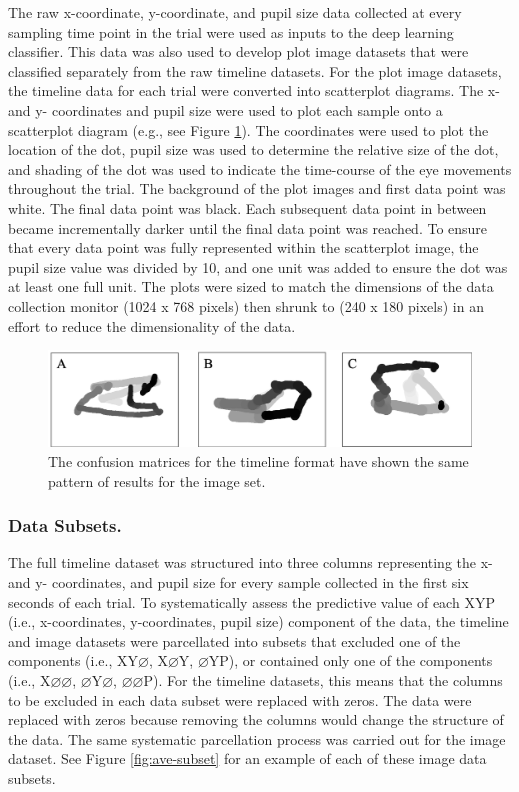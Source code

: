 \documentclass[
  english,
  man,floatsintext]{apa6}
\begin{document}
The raw x-coordinate, y-coordinate, and pupil size data collected at every sampling time point in the trial were used as inputs to the deep learning classifier. This data was also used to develop plot image datasets that were classified separately from the raw timeline datasets. For the plot image datasets, the timeline data for each trial were converted into scatterplot diagrams. The x- and y- coordinates and pupil size were used to plot each sample onto a scatterplot diagram (e.g., see Figure \ref{fig:ave-condition}). The coordinates were used to plot the location of the dot, pupil size was used to determine the relative size of the dot, and shading of the dot was used to indicate the time-course of the eye movements throughout the trial. The background of the plot images and first data point was white. The final data point was black. Each subsequent data point in between became incrementally darker until the final data point was reached. To ensure that every data point was fully represented within the scatterplot image, the pupil size value was divided by 10, and one unit was added to ensure the dot was at least one full unit. The plots were sized to match the dimensions of the data collection monitor (1024 x 768 pixels) then shrunk to (240 x 180 pixels) in an effort to reduce the dimensionality of the data.

\begin{figure}
\centering
\includegraphics{images/cond_imgs.png}
\caption{\label{fig:ave-condition}The confusion matrices for the timeline format have shown the same pattern of results for the image set.}
\end{figure}

\subsubsection{Data Subsets.}

The full timeline dataset was structured into three columns representing the x- and y- coordinates, and pupil size for every sample collected in the first six seconds of each trial. To systematically assess the predictive value of each XYP (i.e., x-coordinates, y-coordinates, pupil size) component of the data, the timeline and image datasets were parcellated into subsets that excluded one of the components (i.e., XY\(\varnothing\), X\(\varnothing\)Y, \(\varnothing\)YP), or contained only one of the components (i.e., X\(\varnothing\varnothing\), \(\varnothing\)Y\(\varnothing\), \(\varnothing\varnothing\)P). For the timeline datasets, this means that the columns to be excluded in each data subset were replaced with zeros. The data were replaced with zeros because removing the columns would change the structure of the data. The same systematic parcellation process was carried out for the image dataset. See Figure \ref{fig:ave-subset} for an example of each of these image data subsets.
\end{document}
